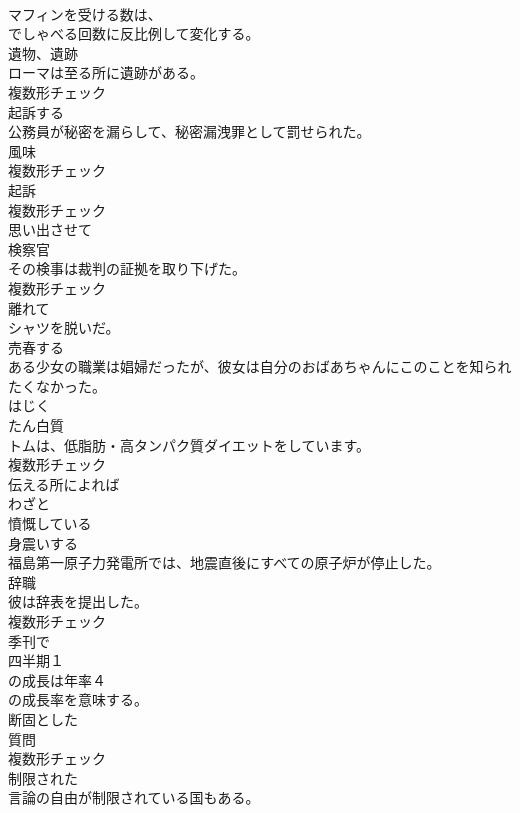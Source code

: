 \documentclass[8pt]{extreport}
\begin{document}
\begin{CJK}{UTF8}{min}
\\	マフィンを受ける数は、
\\	でしゃべる回数に反比例して変化する。	
\\	[名詞]	遺物、遺跡	
\\	ローマは至る所に遺跡がある。	
\\	複数形チェック
\\	[動詞]	起訴する	
\\	公務員が秘密を漏らして、秘密漏洩罪として罰せられた。	
\\	[名詞]	風味	
\\	複数形チェック
\\	[名詞]	起訴	
\\	複数形チェック
\\	[形容詞]	思い出させて	
\\	[名詞]	検察官	
\\	その検事は裁判の証拠を取り下げた。	
\\	複数形チェック
\\	[形容詞]	離れて	
\\	シャツを脱いだ。	
\\	[動詞]	売春する	
\\	ある少女の職業は娼婦だったが、彼女は自分のおばあちゃんにこのことを知られたくなかった。	
\\	[動詞]	はじく	
\\	[名詞]	たん白質	
\\	トムは、低脂肪・高タンパク質ダイエットをしています。	
\\	複数形チェック
\\	[副詞]	伝える所によれば	
\\	[副詞]	わざと	
\\	[形容詞]	憤慨している	
\\	[動詞]	身震いする	
\\	福島第一原子力発電所では、地震直後にすべての原子炉が停止した。	
\\	[名詞]	辞職	
\\	彼は辞表を提出した。	
\\	複数形チェック
\\	[副詞]	季刊で	
\\	四半期１
\\	の成長は年率４
\\	の成長率を意味する。	
\\	[形容詞]	断固とした	
\\	[名詞]	質問	
\\	複数形チェック
\\	[形容詞]	制限された	
\\	言論の自由が制限されている国もある。	

\end{CJK}
\end{document}
